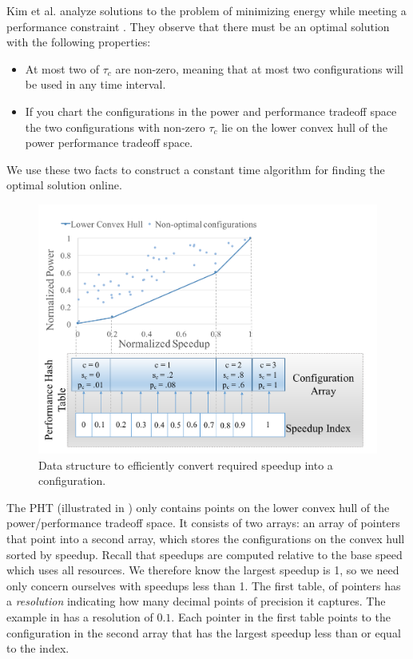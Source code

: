 Kim et al. analyze solutions to the problem of minimizing
energy while meeting a performance constraint \cite{kim-cpsna}.  They
observe that there must be an optimal solution with the following
properties:
\begin{itemize}
\item At most two of $\tau_c$ are non-zero, meaning that at most two
  configurations will be used in any time interval.
\item If you chart the configurations in the power and performance
  tradeoff space the two configurations with non-zero $\tau_c$ lie on
  the lower convex hull of the power performance tradeoff space.
\end{itemize}
We use these two facts to construct a constant time algorithm for
finding the optimal solution online.

\begin{figure}
\includegraphics[width=\columnwidth]{figures/performance-hash-table.pdf}
\caption{Data structure to efficiently convert required speedup into a
  configuration.}
  \label{fig:pht}
\end{figure}

The PHT (illustrated in ) only contains points on the
lower convex hull of the power/performance tradeoff space.  It
consists of two arrays: an array of pointers that point into a second
array, which stores the configurations on the convex hull sorted by
speedup.  Recall that speedups are computed relative to the base speed
which uses all resources.  We therefore know the largest speedup is 1,
so we need only concern ourselves with speedups less than 1.  The
first table, of pointers has a \emph{resolution} indicating how many
decimal points of precision it captures.  The example in
 has a resolution of $0.1$.  Each pointer in the first
table points to the configuration in the second array that has the
largest speedup less than or equal to the index.

